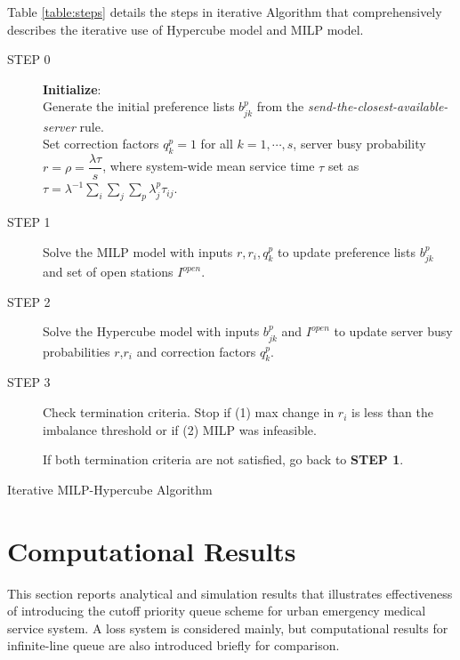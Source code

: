 \documentclass{article}
\begin{document}
Table \eqref{table:steps} details the steps in iterative Algorithm that comprehensively describes the iterative use of Hypercube model and MILP model.

\begin{table}
\noindent\makebox[\linewidth]{\rule{16cm}{0.4pt}}
\begin{description}
\item[STEP 0] \textbf{Initialize}:\\
Generate the initial preference lists $b^p_{jk}$ from the \textit{send-the-closest-available-server} rule. \\
Set correction factors $q_k^p=1$ for all $k=1,\cdots,s$, server busy probability $r=\rho=\dfrac{\lambda \tau}{s}$, where system-wide mean service time $\tau$ set as $\tau= \lambda^{-1} \sum_i \sum_j  \sum_p \lambda^p_j \tau_{ij}$.
\item[STEP 1] Solve the MILP model with inputs $r,r_i,q_k^p$ to update preference lists $b^p_{jk}$ and set of open stations $I^{open}$.
\item[STEP 2] Solve the Hypercube model with inputs $b^p_{jk}$ and $I^{open}$ to update server busy probabilities $r$,$r_i$ and correction factors $q_k^p$.
\item[STEP 3] Check termination criteria. Stop if (1) max change in $r_i$ is less than the imbalance threshold or if (2) MILP was infeasible.

If both termination criteria are not satisfied, go back to \textbf{STEP 1}.
\end{description}
\noindent\makebox[\linewidth]{\rule{16cm}{0.4pt}}
\caption{Iterative MILP-Hypercube Algorithm}
\label{table:steps}

\end{table}







\section{Computational Results}

This section reports analytical and simulation results that illustrates effectiveness of introducing the cutoff priority queue scheme for urban emergency medical service system. A loss system is considered mainly, but computational results for infinite-line queue are also introduced briefly for comparison.
\end{document}
